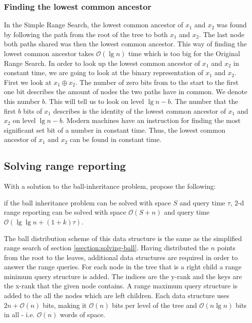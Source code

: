 \subsubsection{Finding the lowest common ancestor}
In the Simple Range Search, the lowest common ancestor of $x_1$ and $x_2$ was found by following the path from the root of the tree to both $x_1$ and $x_2$. The last node both paths shared was then the lowest common ancestor. This way of finding the lowest common ancestor takes $\mathcal{O}(\lg n)$ time which is too big for the Original Range Search.
In order to look up the lowest common ancestor of $x_1$ and $x_2$ in constant time, we are going to look at the binary representation of $x_1$ and $x_2$. First we look at $x_1 \oplus x_2$. The number of zero bits from to the start to the first one bit describes the amount of nodes the two paths have in common. We denote this number $b$. This will tell us to look on level $\lg n - b$. The number that the first $b$ bits of $x_1$ describes is the identity of the lowest common ancestor of $x_1$ and $x_2$ on level $\lg n - b$. Modern machines have an instruction for finding the most significant set bit of a number in constant time. Thus, the lowest common ancestor of $x_1$ and $x_2$ can be found in constant time.


\subsection{Solving range reporting}

With a solution to the ball-inheritance problem, \citet{chanetal} propose the following: 
\begin{customlem}{2.4}\label{lemma24}
if the ball inheritance problem can be solved with space $S$ and query time $\tau$, $2$-d range reporting can be solved with space $\mathcal{O}(S+n)$ and query time $\mathcal{O}(\lg \lg n + (1+k) \tau)$.
\end{customlem}


The ball distribution scheme of this data structure is the same as the simplified range search of section \ref{ssection:solving-ball}. Having distributed the $n$ points from the root to the leaves, additional data structures are required in order to answer the range queries. For each node in the tree that is a right child a range minimum query structure is added. The indices are the y-rank and the keys are the x-rank that the given node contains. A range maximum query structure is added to the all the nodes which are left children. Each data structure uses $2n + \mathcal{O}(n)$ bits, making it $\mathcal{O}(n)$ bits per level of the tree and $\mathcal{O}(n \lg n)$ bits in all - i.e. $\mathcal{O}(n)$ words of space. \\

